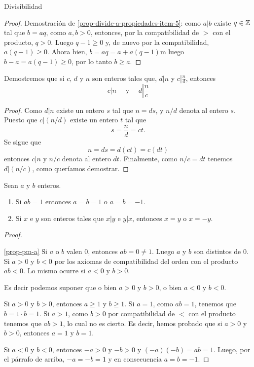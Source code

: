 \begin{section}{Divisibilidad}
\begin{observacion}
\begin{proof}
Demostración de \ref{prop-divide-a-propiedades-item-5}: como $a|b$ existe $q \in {\mathbb Z}$  tal que $b = aq$, como $a, b >0$, entonces, por la compatibilidad de $>$ con el producto,  $q >0$. Luego $q-1 \ge 0$ y,  de nuevo por la compatibilidad, $a(q-1) \ge 0$. Ahora bien, $b = aq = a + a(q-1)$m luego $b-a = a(q-1) \ge 0$, por lo tanto $b \ge a$.
\end{proof}
\end{observacion}


\begin{ejemplo*} Demostremos que si $c$, $d$ y $n$ son enteros tales
que, $d|n$ y $c\left|\frac{n}{d}\right.$, entonces
$$ c|n \quad\text{ y }\quad d\left|\frac{n}{c}\right.$$
\end{ejemplo*}
\begin{proof} Como $d|n$ existe un entero $s$ tal que $n=ds$, y
$n/d$ denota al entero $s$. Puesto que $c|(n/d)$ existe un entero
$t$ tal que
$$s=\frac{n}{d} =ct.
$$
Se sigue que
$$
n=ds=d(ct)=c(dt)$$
 entonces $c|n$ y $n/c$ denota al entero $dt$. Finalmente, como
$n/c=dt$ tenemos $d|(n/c)$, como queríamos demostrar.
\end{proof}

\begin{proposicion}\label{pm} Sean $a$ y $b$ enteros.
\begin{enumerate}[label=\textit{\alph*)}]
\item \label{prop-pm-a} Si  $ab=1$ entonces $a=b=1$ o $a=b=-1$. 
\item \label{prop-pm-b}Si $x$ e $y$ son enteros tales que $x|y$ e $y|x$, entonces $x=y$ o $x=-y$.
\end{enumerate}
\end{proposicion}
\begin{proof}
\

\noindent \ref{prop-pm-a} Si $a$ o $b$ valen $0$, entonces $ab=0 \not=1$. Luego $a$ y $b$ son distintos de $0$. Si $a>0$ y $b<0$ por los axiomas de compatibilidad del orden con el producto $ab<0$. Lo mismo ocurre si $a<0$ y $b>0$.

Es decir podemos suponer que o bien $a>0$ y $b>0$, o bien $a<0$ y $b<0$. 

Si  $a>0$ y $b>0$, entonces  $a\ge 1$ y $b\ge 1$. Si $a=1$, como $ab =1$, tenemos que $b = 1 \cdot b = 1$. Si $a>1$, como  $b>0$ por compatibilidad de $<$ con el producto tenemos que $ab>1$, lo cual no es cierto. Es decir, hemos probado que si  $a>0$ y $b>0$, entonces $a=1$ y $b=1$.

Si  $a<0$ y $b<0$, entonces   $-a>0$ y $-b>0$ y $(-a)(-b) = ab =1$. Luego, por el párrafo de arriba, $-a=-b=1$ y en consecuencia $a=b=-1$.


\end{proof}
\end{section}
